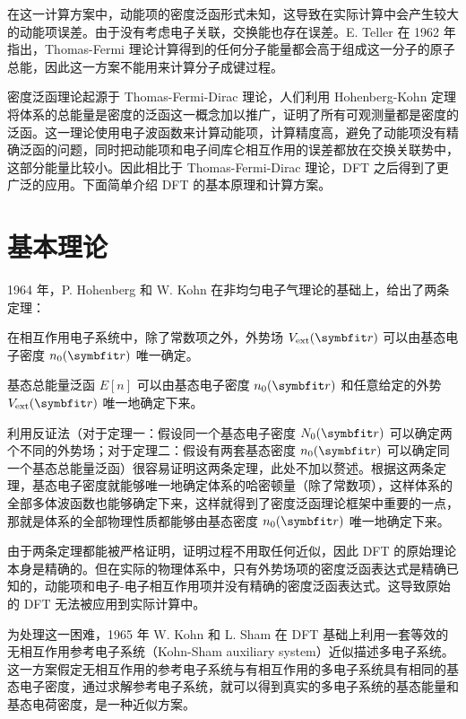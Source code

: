 在这一计算方案中，动能项的密度泛函形式未知，这导致在实际计算中会产生较大的动能项误差。由于没有考虑电子关联，交换能也存在误差。E. Teller 在 1962 年指出，Thomas-Fermi 理论计算得到的任何分子能量都会高于组成这一分子的原子总能，因此这一方案不能用来计算分子成键过程\cite{RevModPhys.34.627}。

密度泛函理论起源于 Thomas-Fermi-Dirac 理论，人们利用 Hohenberg-Kohn 定理将体系的总能量是密度的泛函这一概念加以推广，证明了所有可观测量都是密度的泛函\cite{PhysRev.136.B864}。这一理论使用电子波函数来计算动能项，计算精度高，避免了动能项没有精确泛函的问题，同时把动能项和电子间库仑相互作用的误差都放在交换关联势中，这部分能量比较小。因此相比于 Thomas-Fermi-Dirac 理论，DFT 之后得到了更广泛的应用。下面简单介绍 DFT 的基本原理和计算方案。
\section{基本理论}
1964 年，P. Hohenberg 和 W. Kohn 在非均匀电子气理论的基础上，给出了两条定理：
\begin{theorem}
    在相互作用电子系统中，除了常数项之外，外势场 $V_{\fun{ext}}(\vct{r})$ 可以由基态电子密度 $n_0(\vct{r})$ 唯一确定。
\end{theorem}
\begin{theorem}
    基态总能量泛函 $E[n]$ 可以由基态电子密度 $n_0(\vct{r})$ 和任意给定的外势 $V_{\fun{ext}}(\vct{r})$ 唯一地确定下来。
\end{theorem}
利用反证法（对于定理一：假设同一个基态电子密度 $N_0(\vct{r})$ 可以确定两个不同的外势场；对于定理二：假设有两套基态密度 $n_0(\vct{r})$ 可以确定同一个基态总能量泛函）很容易证明这两条定理\cite{martin_2004}，此处不加以赘述。根据这两条定理，基态电子密度就能够唯一地确定体系的哈密顿量（除了常数项），这样体系的全部多体波函数也能够确定下来，这样就得到了密度泛函理论框架中重要的一点，那就是体系的全部物理性质都能够由基态密度 $n_0(\vct{r})$ 唯一地确定下来。

由于两条定理都能被严格证明，证明过程不用取任何近似，因此 DFT 的原始理论本身是精确的。但在实际的物理体系中，只有外势场项的密度泛函表达式是精确已知的，动能项和电子-电子相互作用项并没有精确的密度泛函表达式。这导致原始的 DFT 无法被应用到实际计算中。

为处理这一困难，1965 年 W. Kohn 和 L. Sham 在 DFT 基础上利用一套等效的无相互作用参考电子系统（Kohn-Sham auxiliary system）近似描述多电子系统\cite{PhysRev.140.A1133}。这一方案假定无相互作用的参考电子系统与有相互作用的多电子系统具有相同的基态电子密度，通过求解参考电子系统，就可以得到真实的多电子系统的基态能量和基态电荷密度，是一种近似方案。

